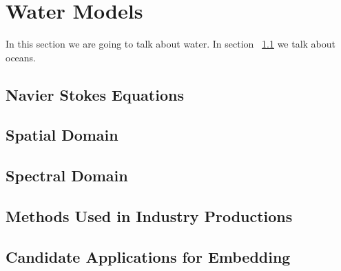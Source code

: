 \section{Water Models}\label{sec:water_models}


In this section we are going to talk about water. In section
~\ref{subsec:navier_stokes} we talk about oceans.

\subsection{Navier Stokes Equations}\label{subsec:navier_stokes}
\subsection{Spatial Domain}\label{subsec:spatial_domain}
\subsection{Spectral Domain}\label{subsec:spectral_domain}
\subsection{Methods Used in Industry Productions}\label{subsec:methods_industry}
\subsection{Candidate Applications for Embedding}\label{subsec:candidate_apps}
